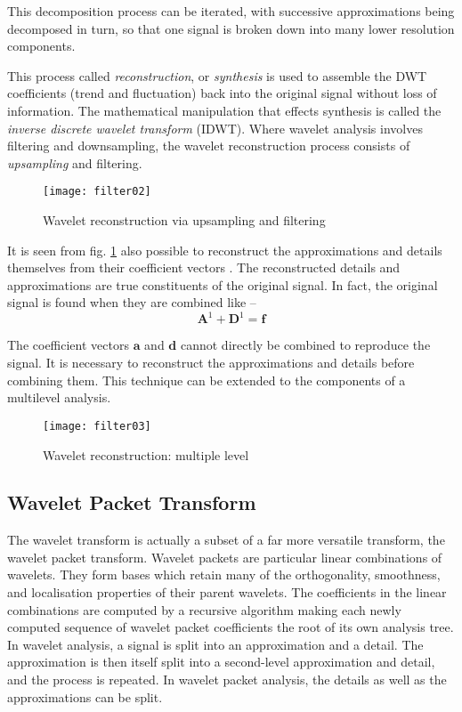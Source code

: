 \documentclass[a4paper,11pt]{report}
\begin{document}
This decomposition process can be iterated, with successive approximations being decomposed in turn, so that one signal is broken down into many lower resolution components.

This process called \emph{reconstruction}, or \emph{synthesis} is used to assemble the DWT coefficients (trend and fluctuation) back into the original signal without loss of information. The mathematical manipulation that effects synthesis is called the \emph{inverse discrete wavelet transform} (IDWT). Where wavelet analysis involves filtering and downsampling, the wavelet reconstruction process consists of \emph{upsampling} and filtering. 
\begin{figure}[h]
\centering
\texttt{[image: filter02]}
\caption{Wavelet reconstruction via upsampling and filtering} \label{filter02}
\end{figure}

It is seen from fig. \ref{filter02} also possible to reconstruct the approximations and details themselves from their coefficient vectors . The reconstructed details and approximations are true constituents of the original signal. In fact, 
the original signal is found when they are combined like --
\begin{displaymath}
\mathbf{A}^{1} + \mathbf{D}^{1} = \mathbf{f}
\end{displaymath}

The coefficient vectors $\mathbf{a}$ and $\mathbf{d}$ cannot directly be combined to reproduce the signal. It is necessary to reconstruct the approximations and details before combining them. This technique can be extended to the components of a multilevel analysis.
\begin{figure}[h]
\centering
\texttt{[image: filter03]}
\caption{Wavelet reconstruction: multiple level} \label{filter03}
\end{figure}

\subsection{Wavelet Packet Transform} 
The wavelet transform is actually a subset of a far more versatile transform, the wavelet packet transform. Wavelet packets are particular linear combinations of wavelets. They form bases which retain many of the orthogonality, smoothness, and localisation properties of their parent wavelets. The coefficients in the linear combinations are computed by a recursive algorithm making each newly computed sequence of wavelet packet coefficients the root of its own analysis tree. In wavelet analysis, a signal is split into an approximation and a detail. The approximation is then itself split into a second-level approximation and detail, and the process is repeated. In wavelet packet analysis, the details as well as the approximations can be split.
\end{document}
